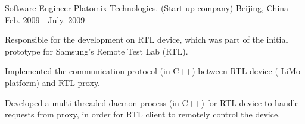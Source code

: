 \begin{cventries}
  \cventry
    {Software Engineer} %
    {Platomix Technologies. (Start-up company)} %
    {Beijing, China} %
    {Feb. 2009 - July. 2009} %
    {
      \begin{cvitems} %
       \item {Responsible for the
    development on RTL device, which was part of the initial prototype for
    Samsung's Remote Test Lab (RTL).}
       \item {Implemented the communication protocol (in C++) between RTL device (
    LiMo platform) and RTL proxy.}
       \item {Developed a multi-threaded daemon process (in C++) for RTL
    device to handle requests from proxy, in order for RTL client
    to remotely control the device.}
      \end{cvitems}
    }

\end{cventries}
